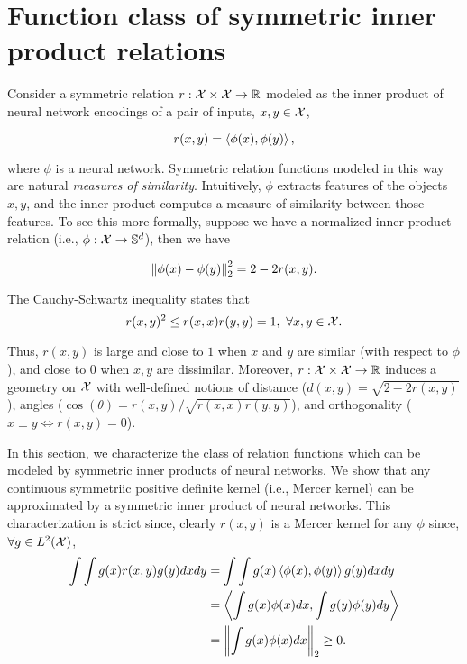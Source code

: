 \section{Function class of symmetric inner product relations}\label{sec:symmetric_relations}

Consider a symmetric relation $r: {\mathcal{X}} \times {\mathcal{X}} \to \mathbb{R}$ modeled as the inner product of neural network encodings of a pair of inputs, $x, y \in {\mathcal{X}}$,

\begin{equation}\label{eq:symmetric_iprod_relation}
    r(x, y) = \left \langle \phi(x), \phi(y) \right\rangle,
\end{equation}

\noindent where $\phi$ is a neural network. Symmetric relation functions modeled in this way are natural \textit{measures of similarity}. Intuitively, $\phi$ extracts features of the objects $x,y$, and the inner product computes a measure of similarity between those features. To see this more formally, suppose we have a normalized inner product relation (i.e., $\phi: {\mathcal{X}} \to {\mathbb{S}}^{d}$), then we have

\begin{equation}
    \left\lVert\phi(x) - \phi(y)\right\rVert_{2}^2 = 2 - 2 r(x, y).
\end{equation}

The Cauchy-Schwartz inequality states that
\begin{equation}
    r(x, y)^2 \leq r(x, x) r(y, y) = 1, \ \forall x, y \in {\mathcal{X}}.
\end{equation}

Thus, $r(x,y)$ is large and close to $1$ when $x$ and $y$ are similar (with respect to $\phi$), and close to $0$ when $x, y$ are dissimilar. Moreover, $r: {\mathcal{X}} \times {\mathcal{X}} \to \mathbb{R}$ induces a geometry on ${\mathcal{X}}$ with well-defined notions of distance ($d(x,y) = \sqrt{2 - 2 r(x,y)}$), angles ($\cos(\theta) = r(x,y)/\sqrt{r(x,x) r(y,y)}$), and orthogonality ($x \perp y \iff r(x,y) = 0$).

In this section, we characterize the class of relation functions which can be modeled by symmetric inner products of neural networks. We show that any continuous symmetriic positive definite kernel (i.e., Mercer kernel) can be approximated by a symmetric inner product of neural networks. This characterization is strict since, clearly $r(x,y)$ is a Mercer kernel for any $\phi$ since, $\forall g \in L^2({\mathcal{X}})$,
\begin{equation*}
    \begin{split}
        \int \int g(x) r(x,y) g(y) dx dy &= \int \int g(x) \left \langle \phi(x), \phi(y) \right\rangle g(y) dx dy \\
        &= \left \langle \int g(x) \phi(x) dx, \int g(y) \phi(y) dy \right\rangle \\
        &= \left\lVert\int g(x) \phi(x) dx\right\rVert_{2} \geq 0.
    \end{split}
\end{equation*}

